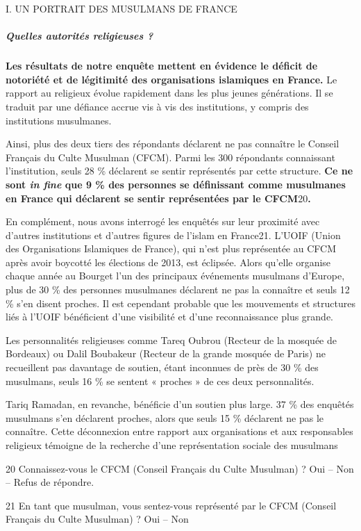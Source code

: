 I. UN PORTRAIT DES MUSULMANS DE FRANCE


\hypertarget{quelles-autorituxe9s-religieuses}{%
\subparagraph{Quelles autorités religieuses
?}\label{quelles-autorituxe9s-religieuses}}


\textbf{Les résultats de notre enquête mettent en évidence le déficit de
notoriété et de légitimité des organisations islamiques en France.} Le
rapport au religieux évolue rapidement dans les plus jeunes générations.
Il se traduit par une défiance accrue vis à vis des institutions, y
compris des institutions musulmanes.

Ainsi, plus des deux tiers des répondants déclarent ne pas connaître le
Conseil Français du Culte Musulman (CFCM). Parmi les 300 répondants
connaissant l'institution, seuls 28 \% déclarent se sentir représentés
par cette structure. \textbf{Ce ne sont \emph{in fine} que 9 \% des
personnes se définissant comme musulmanes en France qui déclarent se
sentir représentées par le CFCM}20\textbf{.}

En complément, nous avons interrogé les enquêtés sur leur proximité avec
d'autres institutions et d'autres figures de l'islam en France21. L'UOIF
(Union des Organisations Islamiques de France), qui n'est plus
représentée au CFCM après avoir boycotté les élections de 2013, est
éclipsée. Alors qu'elle organise chaque année au Bourget l'un des
principaux événements musulmans d'Europe, plus de 30 \% des personnes
musulmanes déclarent ne pas la connaître et seuls 12 \% s'en disent
proches. Il est cependant probable que les mouvements et structures liés
à l'UOIF bénéficient d'une visibilité et d'une reconnaissance plus
grande.

Les personnalités religieuses comme Tareq Oubrou (Recteur de la mosquée
de Bordeaux) ou Dalil Boubakeur (Recteur de la grande mosquée de Paris)
ne recueillent pas davantage de soutien, étant inconnues de près de 30
\% des musulmans, seuls 16 \% se sentent « proches » de ces deux
personnalités.

Tariq Ramadan, en revanche, bénéficie d'un soutien plus large. 37 \% des
enquêtés musulmans s'en déclarent proches, alors que seuls 15 \%
déclarent ne pas le connaître. Cette déconnexion entre rapport aux
organisations et aux responsables religieux témoigne de la recherche
d'une représentation sociale des musulmans

20 Connaissez-vous le CFCM (Conseil Français du Culte Musulman) ? Oui --
Non -- Refus de répondre.

21 En tant que musulman, vous sentez-vous représenté par le CFCM
(Conseil Français du Culte Musulman) ? Oui -- Non

